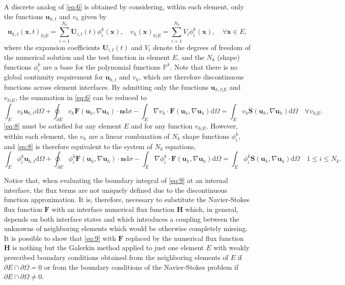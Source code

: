 \documentclass{develop-note}
\begin{document}
A discrete analog of \autoref{eq:6} is obtained by considering, within each element, only the functions $\mathbf{u}_{h,t}$ and $v_{h}$ given by
\begin{equation}
  \mathbf{u}_{h,t}(\mathbf{x},t)_{h|E}=\sum_{i=1}^{N_{k}}\mathbf{U}_{i,t}(t)\phi_{i}^{k}(\mathbf{x}),\quad v_{h}(\mathbf{x})_{h|E}=\sum_{i=1}^{N_{k}}V_{i}\phi_{i}^{k}(\mathbf{x}),\quad\forall\mathbf{x}\in E,
\end{equation}
where the expansion coefficients $\mathbf{U}_{i,t}(t)$ and $V_{i}$ denote the degrees of freedom of the numerical solution and the test function in element $E$, and the $N_{k}$ (shape) functions $\phi_{i}^{k}$ are a base for the polynomial functions $\mathbb{P}^{k}$. Note that there is no global continuity requirement for $\mathbf{u}_{h,t}$ and $v_{h}$, which are therefore discontinuous functions across element interfaces. By admitting only the functions $\mathbf{u}_{h,t|E}$ and $v_{h|E}$, the summation in \autoref{eq:6} can be reduced to
\begin{equation}
  \label{eq:8}
  \int_{E}v_{h}\mathbf{u}_{h,t}\mathrm{d}\Omega+\oint_{\partial E}v_{h}\mathbf{F}(\mathbf{u}_{h},\nabla\mathbf{u}_{h})\cdot\mathbf{n}\mathrm{d}\sigma-\int_{E}\nabla v_{h}\cdot\mathbf{F}(\mathbf{u}_{h},\nabla\mathbf{u}_{h})\mathrm{d}\Omega=\int_{E}v_{h}\mathbf{S}(\mathbf{u}_{h},\nabla\mathbf{u}_{h})\mathrm{d}\Omega\quad\forall v_{h|E}.
\end{equation}
\autoref{eq:8} must be satisfied for any element $E$ and for any function $v_{h|E}$. However, within each element, the $v_{h}$ are a linear combination of $N_{k}$ shape functions $\phi_{i}^{k}$, and \autoref{eq:8} is therefore equivalent to the system of $N_{k}$ equations,
\begin{equation}
  \label{eq:9}
  \int_{E}\phi_{i}^{k}\mathbf{u}_{h,t}\mathrm{d}\Omega+\oint_{\partial E}\phi_{i}^{k}\mathbf{F}(\mathbf{u}_{h},\nabla\mathbf{u}_{h})\cdot\mathbf{n}\mathrm{d}\sigma-\int_{E}\nabla\phi_{i}^{k}\cdot\mathbf{F}(\mathbf{u}_{h},\nabla\mathbf{u}_{h})\mathrm{d}\Omega=\int_{E}\phi_{i}^{k}\mathbf{S}(\mathbf{u}_{h},\nabla\mathbf{u}_{h})\mathrm{d}\Omega\quad 1\leqslant i\leqslant N_{k}.
\end{equation}

Notice that, when evaluating the boundary integral of \autoref{eq:9} at an internal interface, the flux terms are not uniquely defined due to the discontinuous function approximation. It is, therefore, necessary to substitute the Navier-Stokes flux function $\mathbf{F}$ with an interface numerical flux function $\mathbf{H}$ which, in general, depends on both interface states and which introduces a coupling between the unknowns of neighboring elements which would be otherwise completely missing. It is possible to show that \autoref{eq:9} with $\mathbf{F}$ replaced by the numerical flux function $\mathbf{H}$ is nothing but the Galerkin method applied to just one element $E$ with weakly prescribed boundary conditions obtained from the neighboring elements of $E$ if $\partial E\cap\partial\Omega =0$ or from the boundary conditions of the Navier-Stokes problem if $\partial E\cap\partial\Omega\neq 0$.
\end{document}
